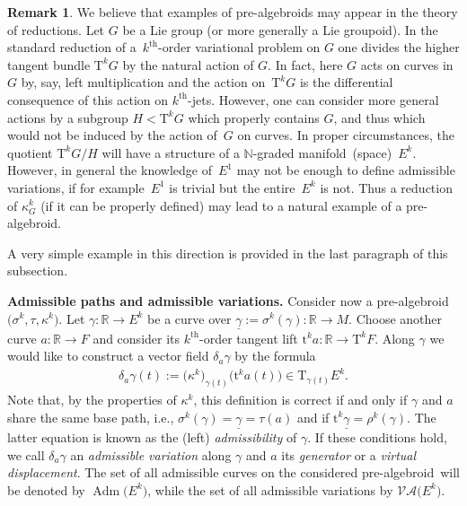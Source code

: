 \documentclass[10pt,a4paper]{amsart}
\newcommand{\grB}{{$\N$-graded manifold}}
\newcommand{\thh}[1]{#1^{\mathrm{th}}} %
\newcommand{\R}{\mathbb{R}}
\newcommand{\N}{\mathbb{N}}
\newcommand{\und}{\underline}
\newcommand{\ra}{\rightarrow}
\newcommand{\del}{\delta}
\newcommand{\prealg}{pre-algebroid} %
\newcommand{\T}{\mathrm{T}} %
\newcommand{\TT}[1]{\mathrm{T}^{#1}} %
\newcommand{\tclass}[2]{\bm{\mathrm{t}}^{#1}#2} %
\newcommand{\Adm}{\operatorname{Adm}} %
\newcommand{\VA}{\mathcal{VA}} %
\numberwithin{equation}{section}
\theoremstyle{definition}
\newtheorem{rem}[thm]{Remark}
\begin{document}
\begin{rem}\label{rem:pre_alg}We believe that examples of \prealg s may appear in the theory of reductions. Let $G$ be a Lie group (or more generally a Lie groupoid). In the standard reduction of a~$\thh{k}$-order variational problem on $G$ one divides the higher tangent bundle $\TT{k}G$ by the natural action of $G$. In fact, here $G$ acts on curves in~$G$ by, say, left multiplication and the action on~$\TT{k}G$ is the differential consequence of this action on $\thh{k}$-jets. However, one can consider more general actions by a subgroup $H<\TT{k} G$ which properly contains $G$, and thus which would not be induced by the action of~$G$ on curves. In proper circumstances, the quotient $\TT{k} G/H$ will have a structure of a \grB\ (space)~$E^k$. However, in general the knowledge of~$E^1$ may not be enough to define admissible variations, if for example~$E^1$ is trivial but the entire~$E^k$ is not. Thus a reduction of $\kappa_G^k$ (if it can be properly defined) may lead to a natural example of a \prealg .

A very simple example in this direction is provided in the last paragraph of this subsection.
\end{rem}

{\bf Admissible paths and admissible variations.} Consider now a \prealg\ $\big(\sigma^k,\tau,\kappa^k\big)$. Let $\gamma\colon \R\ra E^k$ be a curve over $\und{\gamma}:=\sigma^k( \gamma)\colon \R\ra M$. Choose another curve $a\colon \R\ra F$ and consider its $\thh{k}$-order tangent lift $\tclass{k}{a}\colon \R\ra \TT{k} F$. Along $\gamma$ we would like to construct a vector field $\del_a\gamma$ by the formula
\begin{gather}\label{eqn:adm_variation}
 \delta_a\gamma (t):=\big(\kappa^k\big)_{\gamma(t)}\big( \tclass{k}{a}(t)\big)\in \T_{\gamma (t)}E^k.
\end{gather}
Note that, by the properties of $\kappa^k$, this definition is correct if and only if $\gamma$ and $a$ share the same base path, i.e., $\sigma^k(\gamma)=\und{\gamma}=\tau(a)$ and if $\tclass{k}{\und{\gamma}}=\rho^k(\gamma)$. The latter equation is known as the (left) \emph{admissibility} of $\gamma$. If these conditions hold, we call $\delta_a\gamma$ an \emph{admissible variation} along $\gamma$ and $a$ its \emph{generator} or a \emph{virtual displacement}. The set of all admissible curves on the considered \prealg\ will be denoted by $\Adm\big(E^k\big)$, while the set of all admissible variations by $\VA\big(E^k\big)$.
\end{document}
